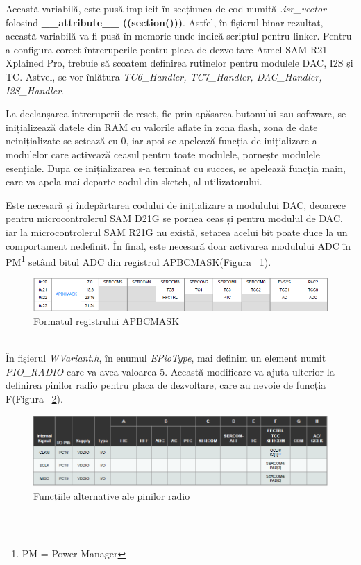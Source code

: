 \documentclass[12pt,a4paper]{report}
\begin{document}
Această variabilă, este pusă implicit în secțiunea de cod numită \textit{.isr\_vector} folosind \textbf{\_\_attribute\_\_ ((section()))}. Astfel, în fișierul binar rezultat, această variabilă va fi pusă în memorie unde indică scriptul pentru linker. Pentru a configura corect întreruperile pentru placa de dezvoltare Atmel SAM R21 Xplained Pro, trebuie să scoatem definirea rutinelor pentru modulele DAC, I2S și TC. Astvel, se vor înlătura \textit{TC6\_Handler, TC7\_Handler, DAC\_Handler, I2S\_Handler}.

La declanșarea întreruperii de reset, fie prin apăsarea butonului sau software, se inițializează datele din RAM cu valorile aflate în zona flash, zona de date neinițializate se setează cu 0, iar apoi se apelează funcția de inițializare a modulelor care activează ceasul pentru toate modulele, pornește modulele esențiale. După ce inițializarea s-a terminat cu succes, se apelează funcția main, care va apela mai departe codul din sketch, al utilizatorului.

Este necesară și îndepărtarea codului de inițializare a modulului DAC, deoarece pentru microcontrolerul SAM D21G se pornea ceas și pentru modulul de DAC, iar la microcontrolerul SAM R21G nu există, setarea acelui bit poate duce la un comportament nedefinit. În final, este necesară doar activarea modulului ADC în PM\footnote{PM = Power Manager} setând bitul ADC din registrul APBCMASK(Figura ~\ref{fig:apbcmask}).
\begin{figure}[h]
\centering
\includegraphics[scale=0.7]{pics/apbcmask.png}
  \caption{Formatul registrului APBCMASK}
  \label{fig:apbcmask}
\end{figure}\\
În fișierul \textit{WVariant.h}, în enumul \textit{EPioType}, mai definim un element numit \textit{PIO\_RADIO} care va avea valoarea 5. Această modificare va ajuta ulterior la definirea pinilor radio pentru placa de dezvoltare, care au nevoie de funcția F(Figura ~\ref{fig:alternatefunctions}).
\begin{figure}[h]
\centering
\includegraphics[scale=0.7]{pics/alternate_functions.png}
  \caption{Funcțiile alternative ale pinilor radio}
  \label{fig:alternatefunctions}
\end{figure}\\
\end{document}
